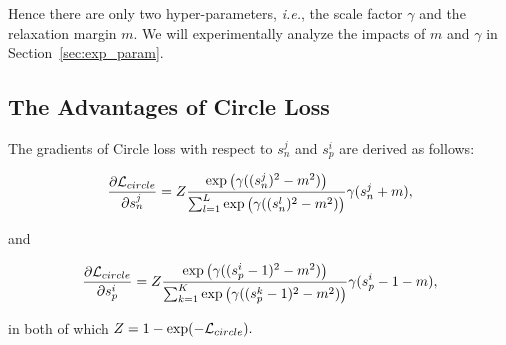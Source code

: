 \documentclass[10pt,twocolumn,letterpaper]{article}
\begin{document}
Hence there are only two hyper-parameters, \emph{i.e.}, the scale factor $\gamma$ and the relaxation margin $m$.
We will experimentally analyze the impacts of $m$ and $\gamma$ in Section~\ref{sec:exp_param}.



\subsection{The Advantages of Circle Loss}\label{sec:method_character}
{The gradients} of Circle loss with respect to $s_n^j$ and $s_p^i$ are derived as follows:
\begin{small}
\begin{equation}
    \footnotesize 
    \frac{\partial \mathcal{L}_{circle}}{\partial s_n^j}
    =Z\frac{\exp\big(\gamma((s_n^j)^2-m^2)\big)}{\sum_{l=1}^L\exp\big(\gamma((s_n^l)^2-m^2)\big)}\gamma(s_n^j+m),
\end{equation}
\end{small}
and
\begin{small}
\begin{equation}\label{eq:gradient_neg}
    \footnotesize 
     \frac{\partial \mathcal{L}_{circle}}{\partial s_p^i}    =Z\frac{\exp\big(\gamma((s_p^i-1)^2-m^2)\big)}{\sum_{k=1}^K\exp\big(\gamma((s_p^k-1)^2-m^2)\big)}\gamma(s_p^i-1-m),
\end{equation}
\end{small}
in both of which
$
\footnotesize{
Z=1-\exp(-\mathcal{L}_{circle})}.
$
\end{document}
